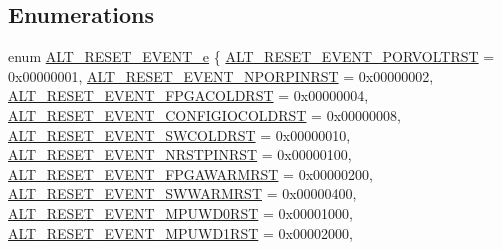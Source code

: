 \subsection*{Enumerations}
\begin{DoxyCompactItemize}
\item 
enum \mbox{\hyperlink{group__RST__MGR__STATUS_gaec1a3a92fb6ca1987fb805679ebae4ef}{A\+L\+T\+\_\+\+R\+E\+S\+E\+T\+\_\+\+E\+V\+E\+N\+T\+\_\+e}} \{ \newline
\mbox{\hyperlink{group__RST__MGR__STATUS_ggaec1a3a92fb6ca1987fb805679ebae4efaeeb94b09e63ac3c9ef3bc7aadeca68e2}{A\+L\+T\+\_\+\+R\+E\+S\+E\+T\+\_\+\+E\+V\+E\+N\+T\+\_\+\+P\+O\+R\+V\+O\+L\+T\+R\+ST}} = 0x00000001, 
\mbox{\hyperlink{group__RST__MGR__STATUS_ggaec1a3a92fb6ca1987fb805679ebae4efa8aae51e8c8943ffd653cc7aea2b63d67}{A\+L\+T\+\_\+\+R\+E\+S\+E\+T\+\_\+\+E\+V\+E\+N\+T\+\_\+\+N\+P\+O\+R\+P\+I\+N\+R\+ST}} = 0x00000002, 
\mbox{\hyperlink{group__RST__MGR__STATUS_ggaec1a3a92fb6ca1987fb805679ebae4efa1c00925e9adc1ffd43e13d7c0deab196}{A\+L\+T\+\_\+\+R\+E\+S\+E\+T\+\_\+\+E\+V\+E\+N\+T\+\_\+\+F\+P\+G\+A\+C\+O\+L\+D\+R\+ST}} = 0x00000004, 
\mbox{\hyperlink{group__RST__MGR__STATUS_ggaec1a3a92fb6ca1987fb805679ebae4efae7ddade0e2ebcb485485b8fcf09c52d4}{A\+L\+T\+\_\+\+R\+E\+S\+E\+T\+\_\+\+E\+V\+E\+N\+T\+\_\+\+C\+O\+N\+F\+I\+G\+I\+O\+C\+O\+L\+D\+R\+ST}} = 0x00000008, 
\newline
\mbox{\hyperlink{group__RST__MGR__STATUS_ggaec1a3a92fb6ca1987fb805679ebae4efaa66dfbf1d06347a823d98ccc332313d2}{A\+L\+T\+\_\+\+R\+E\+S\+E\+T\+\_\+\+E\+V\+E\+N\+T\+\_\+\+S\+W\+C\+O\+L\+D\+R\+ST}} = 0x00000010, 
\mbox{\hyperlink{group__RST__MGR__STATUS_ggaec1a3a92fb6ca1987fb805679ebae4efa0a305baaaa6cd445f0ef0fe6a1c4b098}{A\+L\+T\+\_\+\+R\+E\+S\+E\+T\+\_\+\+E\+V\+E\+N\+T\+\_\+\+N\+R\+S\+T\+P\+I\+N\+R\+ST}} = 0x00000100, 
\mbox{\hyperlink{group__RST__MGR__STATUS_ggaec1a3a92fb6ca1987fb805679ebae4efaec44537eb4210dddaaeacaf38c2b9faa}{A\+L\+T\+\_\+\+R\+E\+S\+E\+T\+\_\+\+E\+V\+E\+N\+T\+\_\+\+F\+P\+G\+A\+W\+A\+R\+M\+R\+ST}} = 0x00000200, 
\mbox{\hyperlink{group__RST__MGR__STATUS_ggaec1a3a92fb6ca1987fb805679ebae4efa4f49cec73a74e0fab1c43419ec89f977}{A\+L\+T\+\_\+\+R\+E\+S\+E\+T\+\_\+\+E\+V\+E\+N\+T\+\_\+\+S\+W\+W\+A\+R\+M\+R\+ST}} = 0x00000400, 
\newline
\mbox{\hyperlink{group__RST__MGR__STATUS_ggaec1a3a92fb6ca1987fb805679ebae4efa863385e9678a3a699926f7f91c8d5df1}{A\+L\+T\+\_\+\+R\+E\+S\+E\+T\+\_\+\+E\+V\+E\+N\+T\+\_\+\+M\+P\+U\+W\+D0\+R\+ST}} = 0x00001000, 
\mbox{\hyperlink{group__RST__MGR__STATUS_ggaec1a3a92fb6ca1987fb805679ebae4efaa880c48484ed2617d6f201857cd2b999}{A\+L\+T\+\_\+\+R\+E\+S\+E\+T\+\_\+\+E\+V\+E\+N\+T\+\_\+\+M\+P\+U\+W\+D1\+R\+ST}} = 0x00002000, 

\end{DoxyCompactItemize}
